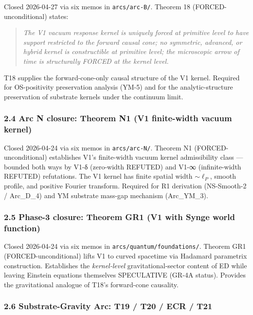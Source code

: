 \documentclass[
]{article}
\begin{document}
Closed 2026-04-27 via six memos in \texttt{arcs/arc-B/}. Theorem 18
(FORCED-unconditional) states:

\begin{quote}
\emph{The V1 vacuum response kernel is uniquely forced at primitive
level to have support restricted to the forward causal cone; no
symmetric, advanced, or hybrid kernel is constructible at primitive
level; the microscopic arrow of time is structurally FORCED at the
kernel level.}
\end{quote}

T18 supplies the forward-cone-only causal structure of the V1 kernel.
Required for OS-positivity preservation analysis (YM-5) and for the
analytic-structure preservation of substrate kernels under the continuum
limit.

\subsubsection{2.4 Arc N closure: Theorem N1 (V1 finite-width vacuum
kernel)}\label{arc-n-closure-theorem-n1-v1-finite-width-vacuum-kernel}

Closed 2026-04-24 via six memos in \texttt{arcs/arc-N/}. Theorem N1
(FORCED-unconditional) establishes V1's finite-width vacuum kernel
admissibility class --- bounded both ways by V1-δ (zero-width REFUTED)
and V1-∞ (infinite-width REFUTED) refutations. The V1 kernel has finite
spatial width \(\sim\ell_P\), smooth profile, and positive Fourier
transform. Required for R1 derivation (NS-Smooth-2 / Arc\_D\_4) and YM
substrate mass-gap mechanism (Arc\_YM\_3).

\subsubsection{2.5 Phase-3 closure: Theorem GR1 (V1 with Synge world
function)}\label{phase-3-closure-theorem-gr1-v1-with-synge-world-function}

Closed 2026-04-24 via six memos in \texttt{arcs/quantum/foundations/}.
Theorem GR1 (FORCED-unconditional) lifts V1 to curved spacetime via
Hadamard parametrix construction. Establishes the \emph{kernel-level}
gravitational-sector content of ED while leaving Einstein equations
themselves SPECULATIVE (GR-4A status). Provides the gravitational
analogue of T18's forward-cone causality.

\subsubsection{2.6 Substrate-Gravity Arc: T19 / T20 / ECR /
T21}\label{substrate-gravity-arc-t19-t20-ecr-t21}
\end{document}

